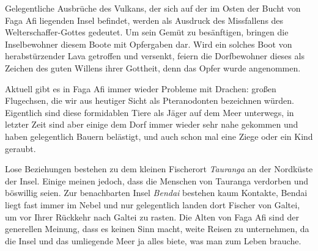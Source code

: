 \documentclass[11pt]{wbzine}
\begin{document}
\begin{multicols}{2}
    Gelegentliche Ausbrüche des Vulkans, der sich auf der im Osten
    der Bucht von Faga Afi liegenden Insel befindet, werden als
    Ausdruck des Missfallens des Welterschaffer-Gottes gedeutet. Um
    sein Gemüt zu besänftigen, bringen die Inselbewohner diesem 
    Boote mit Opfergaben dar. Wird ein solches Boot von
    herabstürzender Lava getroffen und versenkt, feiern die
    Dorfbewohner dieses als Zeichen des guten Willens ihrer
    Gottheit, denn das Opfer wurde angenommen.


    Aktuell gibt es in Faga Afi immer wieder Probleme mit Drachen:
    großen Flugechsen, die wir aus heutiger Sicht als Pteranodonten
    bezeichnen würden. Eigentlich sind diese formidablen Tiere als
    Jäger auf dem Meer unterwegs, in letzter Zeit sind aber einige
    dem Dorf immer wieder sehr nahe gekommen und haben gelegentlich
    Bauern belästigt, und auch schon mal eine Ziege oder ein Kind
    geraubt.

    Lose Beziehungen bestehen zu dem kleinen Fischerort
    \textit{Tauranga} an der Nordküste der Insel. Einige meinen
    jedoch, dass die Menschen von Tauranga verdorben und
    böswillig seien. Zur benachbarten Insel \textit{Bendai} bestehen
    kaum Kontakte, Bendai liegt fast immer im Nebel und nur
    gelegentlich landen dort Fischer von Galtei, um vor Ihrer
    Rückkehr nach Galtei zu rasten. Die Alten von Faga Afi sind der
    generellen Meinung, dass es keinen Sinn macht, weite Reisen zu
    unternehmen, da die Insel und das umliegende Meer ja alles
    biete, was man zum Leben brauche.

    

\end{multicols}
\end{document}
